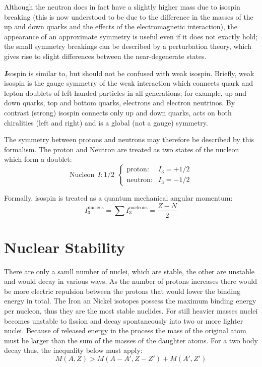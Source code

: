 \documentclass[10pt,a4paper]{article}
\newcounter{theo}
\newenvironment{callout}
	{\begin{calloutbox}\color{charcoal}\textbf\textit}
	{\end{calloutbox}}
\begin{document}
Although the neutron does in fact have a slightly higher mass due to isospin breaking (this is now understood to be due to the difference in the masses of the up and down quarks and the effects of the electromagnetic interaction), the appearance of an approximate symmetry is useful even if it does not exactly hold; the small symmetry breakings can be described by a perturbation theory, which gives rise to slight differences between the near-degenerate states.
\begin{callout}
    Isospin is similar to, but should not be confused with weak isospin. Briefly, weak isospin is the gauge symmetry of the weak interaction which connects quark and lepton doublets of left-handed particles in all generations; for example, up and down quarks, top and bottom quarks, electrons and electron neutrinos. By contrast (strong) isospin connects only up and down quarks, acts on both chiralities (left and right) and is a global (not a gauge) symmetry.
\end{callout}

The symmetry between protons and neutrons may therefore be described by this formalism. The proton and Neutron are treated as two states of the nucleon which form a doublet:
\begin{equation}
\text{Nucleon} \ \ I :1/2 \ \ \left\{
    \begin{array}{ll}
        \text{proton:} & I_3 = +1/2\\
        \text{neutron:} & I_3 = -1/2
    \end{array}\right.
\end{equation}

Formally, isospin is treated as a quantum mechanical angular momentum:
\begin{equation}
    I_3^{\text{nucleus}}= \sum  I_3^{\text{nucleons}} = \frac{Z-N}{2}
\end{equation}

\section{Nuclear Stability}
There are only a samll number of nuclei, which are stable, the other are unstable and would decay in various ways. As the number of protons increases there would be more electric repulsion between the protons that would lower the binding energy in total. The Iron an Nickel isotopes possess the maximum binding energy per nucleon, thus they are the most stable nuclides. For still heavier masses nuclei becomes unstable to fission and decay spontaneously into two or more lighter nuclei. Because of released energy in the process the mass of the original atom must be larger than the sum of the masses of the daughter atoms. For a two body decay thus, the inequality below must apply:
\begin{equation}
    M(A,Z) > M(A-A',Z-Z') + M(A', Z')
\end{equation}
\end{document}
